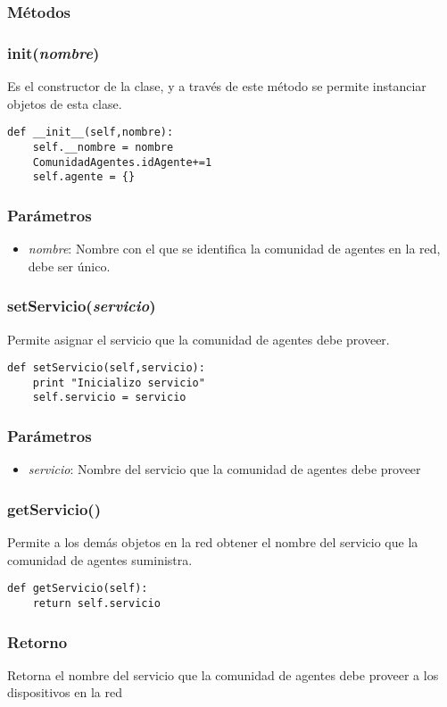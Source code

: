 \documentclass{article}
\begin{document}
\subsubsection*{Métodos}
\subsubsection{\textbf{init}(\textit{nombre})}
Es el constructor de la clase, y a través de este método se permite instanciar objetos de esta clase.
\begin{lstlisting}
def __init__(self,nombre):
	self.__nombre = nombre
	ComunidadAgentes.idAgente+=1
	self.agente = {}
\end{lstlisting}
\subsubsection*{Parámetros}
\begin{itemize}
\item \textit{nombre}: Nombre con el que se identifica la comunidad de agentes en la red, debe ser único.
\end{itemize}
\subsubsection{\textbf{setServicio}(\textit{servicio})}
Permite asignar el servicio que la comunidad de agentes debe proveer.
\begin{lstlisting}
def setServicio(self,servicio):
	print "Inicializo servicio"
	self.servicio = servicio
\end{lstlisting}
\subsubsection*{Parámetros}
\begin{itemize}
\item \textit{servicio}: Nombre del servicio que la comunidad de agentes debe proveer
\end{itemize}
\subsubsection{\textbf{getServicio}()}
Permite a los demás objetos en la red obtener el nombre del servicio que la comunidad de agentes suministra.
\begin{lstlisting}
def getServicio(self):
	return self.servicio
\end{lstlisting}
\subsubsection*{Retorno}
Retorna el nombre del servicio que la comunidad de agentes debe proveer a los dispositivos en la red
\end{document}
